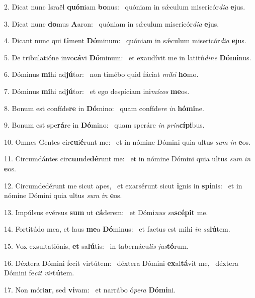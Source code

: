2. Dicat nunc Israël \textbf{quón}iam \textbf{bo}nus: \ast\  quóniam in sǽculum misericór\textit{di}\textit{a} \textbf{e}jus.\

3. Dicat nunc \textbf{do}mus \textbf{A}aron: \ast\  quóniam in sǽculum misericór\textit{di}\textit{a} \textbf{e}jus.\

4. Dicant nunc qui \textbf{ti}ment \textbf{Dó}minum: \ast\  quóniam in sǽculum misericór\textit{di}\textit{a} \textbf{e}jus.\

5. De tribulatióne invo\textbf{cá}vi \textbf{Dó}minum: \ast\  et exaudívit me in latitú\textit{di}\textit{ne} \textbf{Dó}\textbf{mi}nus.\

6. Dóminus \textbf{mi}hi ad\textbf{jú}tor: \ast\  non timébo quid fáciat \textit{mi}\textit{hi} \textbf{ho}mo.\

7. Dóminus \textbf{mi}hi ad\textbf{jú}tor: \ast\  et ego despíciam ini\textit{mí}\textit{cos} \textbf{me}os.\

8. Bonum est confíde\textbf{re} in \textbf{Dó}mino: \ast\  quam confíde\textit{re} \textit{in} \textbf{hó}\textbf{mi}ne.\

9. Bonum est spe\textbf{rá}re in \textbf{Dó}mino: \ast\  quam speráre \textit{in} \textit{prin}\textbf{cí}\textbf{pi}bus.\

10. Omnes Gentes cir\textbf{cu}i\textbf{é}runt me: \ast\  et in nómine Dómini quia ultus \textit{sum} \textit{in} \textbf{e}os.\

11. Circumdántes cir\textbf{cum}de\textbf{dé}runt me: \ast\  et in nómine Dómini quia ultus \textit{sum} \textit{in} \textbf{e}os.\

12. Circumdedérunt me sicut apes, \dag\  et exarsérunt sicut \textbf{i}gnis in \textbf{spi}nis: \ast\  et in nómine Dómini quia ultus \textit{sum} \textit{in} \textbf{e}os.\

13. Impúlsus evérsus \textbf{sum} ut \textbf{cá}derem: \ast\  et Dómi\textit{nus} \textit{su}\textbf{scé}\textbf{pit} me.\

14. Fortitúdo mea, et laus \textbf{me}a \textbf{Dó}minus: \ast\  et factus est mihi \textit{in} \textit{sa}\textbf{lú}tem.\

15. Vox exsultatiónis, \textbf{et} sa\textbf{lú}tis: \ast\  in tabernácu\textit{lis} \textit{jus}\textbf{tó}rum.\

16. Déxtera Dómini fecit virtútem: \dag\  déxtera Dómini \textbf{ex}al\textbf{tá}vit me, \ast\  déxtera Dómini fe\textit{cit} \textit{vir}\textbf{tú}tem.\

17. Non móri\textbf{ar}, sed \textbf{vi}vam: \ast\  et narrábo ó\textit{pe}\textit{ra} \textbf{Dó}\textbf{mi}ni.\

